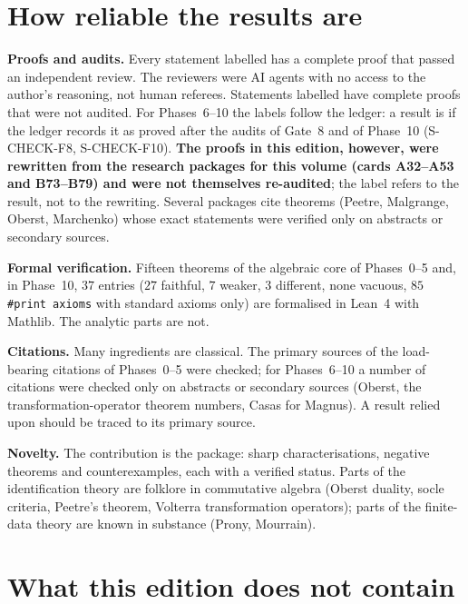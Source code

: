 \section{How reliable the results are}

\textbf{Proofs and audits.} Every statement labelled \proved{} has a complete proof that passed an independent review. The reviewers were AI agents with no access to the author's reasoning, not human referees. Statements labelled \pw{} have complete proofs that were not audited. For Phases~6--10 the labels follow the ledger: a result is \proved{} if the ledger records it as proved after the audits of Gate~8 and of Phase~10 (S-CHECK-F8, S-CHECK-F10). \textbf{The proofs in this edition, however, were rewritten from the research packages for this volume (cards A32--A53 and B73--B79) and were not themselves re-audited}; the label refers to the result, not to the rewriting. Several packages cite theorems (Peetre, Malgrange, Oberst, Marchenko) whose exact statements were verified only on abstracts or secondary sources.

\textbf{Formal verification.} Fifteen theorems of the algebraic core of Phases~0--5 and, in Phase~10, $37$ entries ($27$ faithful, $7$ weaker, $3$ different, none vacuous, $85$ \texttt{\#print axioms} with standard axioms only) are formalised in Lean~4 with Mathlib. The analytic parts are not.

\textbf{Citations.} Many ingredients are classical. The primary sources of the load-bearing citations of Phases~0--5 were checked; for Phases~6--10 a number of citations were checked only on abstracts or secondary sources (Oberst, the transformation-operator theorem numbers, Casas for Magnus). A result relied upon should be traced to its primary source.

\textbf{Novelty.} The contribution is the package: sharp characterisations, negative theorems and counterexamples, each with a verified status. Parts of the identification theory are folklore in commutative algebra (Oberst duality, socle criteria, Peetre's theorem, Volterra transformation operators); parts of the finite-data theory are known in substance (Prony, Mourrain).

\section{What this edition does not contain}


